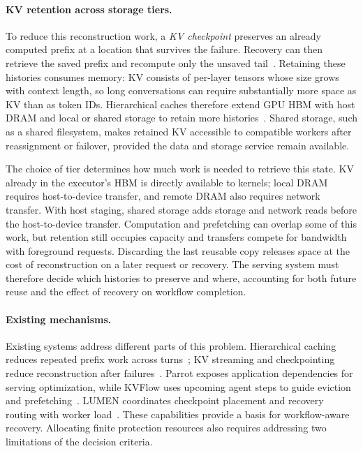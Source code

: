 \paragraph{KV retention across storage tiers.}
To reduce this reconstruction work, a \emph{KV checkpoint} preserves an
already computed prefix at a location that survives the failure.
Recovery can then retrieve the saved prefix and recompute only the
unsaved tail~\cite{strati2024dejavu,jayakody2026ghostserve}.
Retaining these histories consumes memory: KV consists of per-layer
tensors whose size grows with context length, so long conversations can
require substantially more space as KV than as token IDs.
Hierarchical caches therefore extend GPU HBM with host DRAM and local
or shared storage to retain more histories~\cite{gao2024cachedattention,qin2025mooncake}.
Shared storage, such as a shared filesystem, makes retained KV accessible
to compatible workers after reassignment or failover, provided the data
and storage service remain available.

The choice of tier determines how much work is needed to retrieve this
state. KV already in the executor's HBM is directly available to kernels;
local DRAM requires host-to-device transfer, and remote DRAM also requires
network transfer. With host staging, shared storage adds storage and
network reads before the host-to-device transfer. Computation and
prefetching can overlap some of this work, but retention still occupies
capacity and transfers compete for bandwidth with foreground requests.
Discarding the last reusable copy releases space at the cost of
reconstruction on a later request or recovery. The serving system must
therefore decide which histories to preserve and where, accounting for
both future reuse and the effect of recovery on workflow completion.

\paragraph{Existing mechanisms.}
Existing systems address different parts of this problem.
Hierarchical caching reduces repeated prefix work across
turns~\cite{gao2024cachedattention,qin2025mooncake}; KV streaming and
checkpointing reduce reconstruction after
failures~\cite{strati2024dejavu,jayakody2026ghostserve}.
Parrot exposes application dependencies for serving optimization, while
KVFlow uses upcoming agent steps to guide eviction and
prefetching~\cite{lin2024parrot,pan2025kvflow}. LUMEN coordinates
checkpoint placement and recovery routing with worker
load~\cite{cao2026lumen}. These capabilities provide a basis for
workflow-aware recovery. Allocating finite protection resources also
requires addressing two limitations of the decision criteria.

